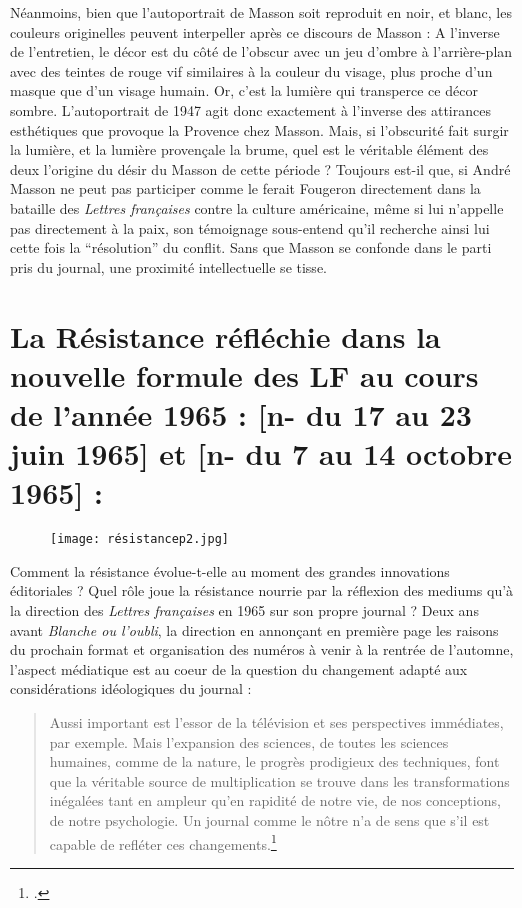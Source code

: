 Néanmoins, bien que l’autoportrait de Masson soit reproduit en noir, et blanc, les couleurs originelles peuvent interpeller après ce discours de Masson : A l’inverse de l’entretien, le décor est du côté de l’obscur avec un jeu d’ombre à l’arrière-plan avec des teintes de rouge vif similaires à la couleur du visage, plus proche d’un masque que d’un visage humain. Or, c’est la lumière qui transperce ce décor sombre. L’autoportrait de 1947 agit donc exactement à l’inverse des attirances esthétiques que provoque la Provence chez Masson. Mais, si l’obscurité fait surgir la lumière, et la lumière provençale la brume, quel est le véritable élément des deux l’origine du désir du Masson de cette période ? Toujours est-il que, si André Masson ne peut pas participer comme le ferait Fougeron directement dans la bataille des \emph{Lettres françaises }contre la culture américaine, même si lui n’appelle pas directement à la paix, son témoignage sous-entend qu’il recherche ainsi lui cette fois la \enquote{résolution} du conflit. Sans que Masson se confonde dans le parti pris du journal, une proximité intellectuelle se tisse.  

\section{La Résistance réfléchie dans la nouvelle formule des LF au cours de l’année 1965 : [n- du 17 au 23 juin 1965] et  [n- du 7 au 14 octobre 1965] :}

\begin{figure}[H]
   \centering
   \texttt{[image: résistancep2.jpg]}
	\caption{\cite{specialelsa}}\label{fig:Réssitance}
\end{figure}


Comment la résistance évolue-t-elle au moment des grandes innovations éditoriales ? Quel rôle joue la résistance nourrie par la réflexion des mediums qu’à la direction des \emph{Lettres françaises} en 1965 sur son propre journal ? Deux ans avant \emph{Blanche ou l’oubli}, la direction en annonçant en première page les raisons du prochain format et organisation des numéros à venir à la rentrée de l’automne, l’aspect médiatique est au coeur de la question du changement adapté aux considérations idéologiques du journal :

\begin{quote}
Aussi important est l’essor de la télévision et ses perspectives immédiates, par exemple. Mais l’expansion des sciences, de toutes les sciences humaines, comme de la nature, le progrès prodigieux des techniques, font que la véritable source de multiplication se trouve dans les transformations inégalées tant en ampleur qu’en rapidité de notre vie, de nos conceptions, de notre psychologie. Un journal comme le nôtre n’a de sens que s’il est capable de refléter ces changements.\footcite{nouvelleformule}\end{quote}


